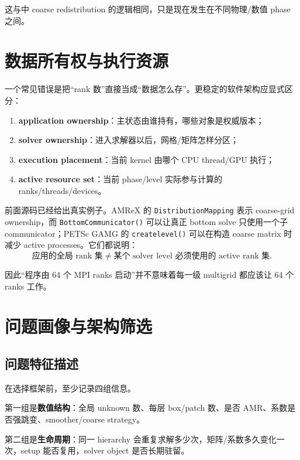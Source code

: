 这与中 coarse redistribution 的逻辑相同，只是现在发生在不同物理/数值 phase 之间。

\section{数据所有权与执行资源}

一个常见错误是把“rank 数”直接当成“数据怎么存”。更稳定的软件架构应显式区分：

\begin{enumerate}
\item \textbf{application ownership}：主状态由谁持有，哪些对象是权威版本；
\item \textbf{solver ownership}：进入求解器以后，网格/矩阵怎样分区；
\item \textbf{execution placement}：当前 kernel 由哪个 CPU thread/GPU 执行；
\item \textbf{active resource set}：当前 phase/level 实际参与计算的 ranks/threads/devices。
\end{enumerate}

前面源码已经给出真实例子。AMReX 的 \texttt{DistributionMapping} 表示 coarse-grid ownership，而 \texttt{BottomCommunicator()} 可以让真正 bottom solve 只使用一个子 communicator；PETSc GAMG 的 \texttt{createlevel()} 可以在构造 coarse matrix 时减少 active processes。它们都说明：
\begin{equation}
\boxed{
\text{应用的全局 rank 集}
\neq
\text{某个 solver level 必须使用的 active rank 集}.
}
\label{eq:architecture-global-vs-active}
\end{equation}

因此“程序由 64 个 MPI ranks 启动”并不意味着每一级 multigrid 都应该让 64 个 ranks 工作。

\section{问题画像与架构筛选}

\subsection{问题特征描述}
在选择框架前，至少记录四组信息。

第一组是\textbf{数值结构}：全局 unknown 数、每层 box/patch 数、是否 AMR、系数是否强跳变、smoother/coarse strategy。

第二组是\textbf{生命周期}：同一 hierarchy 会重复求解多少次，矩阵/系数多久变化一次，setup 能否复用，solver object 是否长期驻留。

